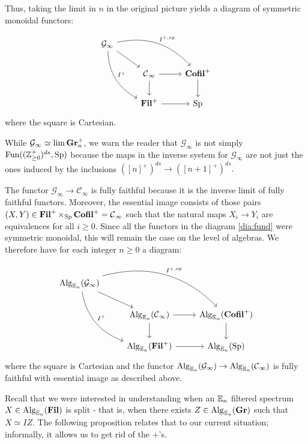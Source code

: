 Thus, taking the limit in $n$ in the original picture yields a diagram of symmetric monoidal functors:

\begin{equation}\label{dia:fund}
\begin{tikzcd}
\mathcal{G}_\infty
 \arrow[drr, bend left, "I^{+,op}"]
  \arrow[ddr, bend right, "I^+"]
  \arrow[dr] & & \\
&\C_\infty \arrow[r] \arrow[d]&  \Cofil^+ \arrow[d]\\
& \Fil^+ \arrow[r]& \Sp
\end{tikzcd}
\end{equation}
where the square is Cartesian.

\begin{rmk}
While $\mathcal{G}_\infty \simeq \lim \operatorname{\mathbf{Gr}}_n^{+}$, we warn the reader that $\mathcal{G}_\infty$ is not simply $\operatorname{\text{Fun}}((\operatorname{\mathbb{Z}}_{\geq 0}^+)^{ds}, \operatorname{\mathrm{Sp}})$ because the maps in the inverse system for $\mathcal{G}_\infty$ are not just the ones induced by the inclusions $([n]^+)^{ds} \to ([n+1]^+)^{ds}.$
\end{rmk}

The functor $\mathcal{G}_\infty \to \mathcal{C}_\infty$ is fully faithful because it is the inverse limit of fully faithful functors.  Moreover, the essential image consists of those pairs $(X,Y)\in \operatorname{\mathbf{Fil}}^+\times_{\operatorname{\mathrm{Sp}}} \operatorname{\mathbf{Cofil}}^+ = \operatorname{\mathcal{C}}_{\infty}$ such that the natural maps $X_i\to Y_i$ are equivalences for all $i\geq 0$.   Since all the functors in the diagram \ref{dia:fund} were symmetric monoidal, this will remain the case on the level of algebras.  We therefore have for each integer $n\geq 0$ a diagram:

\begin{equation}\label{dia:fundmon}
\begin{tikzcd}
\Alg_{\E_n}(\mathcal{G}_\infty)
 \arrow[drr, bend left, "I^{+,op}"]
  \arrow[ddr, bend right, "I^+"]
  \arrow[dr] & & \\
&\Alg_{\E_n}(\C_\infty) \arrow[r] \arrow[d]&  \Alg_{\E_n}(\Cofil^+ )\arrow[d]\\
& \Alg_{\E_n}(\Fil^+ )\arrow[r]& \Alg_{\E_n}(\Sp)
\end{tikzcd}
\end{equation}
where the square is Cartesian and the functor $\operatorname{\mathrm{Alg}}_{\operatorname{\mathbb{E}}_n}(\mathcal{G}_\infty) \to \operatorname{\mathrm{Alg}}_{\operatorname{\mathbb{E}}_n}(\operatorname{\mathcal{C}}_\infty)$ is fully faithful with essential image as described above.  


Recall that we were interested in understanding when an $\operatorname{\mathbb{E}}_n$ filtered spectrum $X\in \operatorname{\mathrm{Alg}}_{\operatorname{\mathbb{E}}_n}(\operatorname{\mathbf{Fil}})$ is split - that is, when there exists $Z\in \operatorname{\mathrm{Alg}}_{\operatorname{\mathbb{E}}_n}(\operatorname{\mathbf{Gr}})$ such that $X \simeq IZ.$  The following proposition relates that to our current situation; informally, it allows us to get rid of the +'s.

